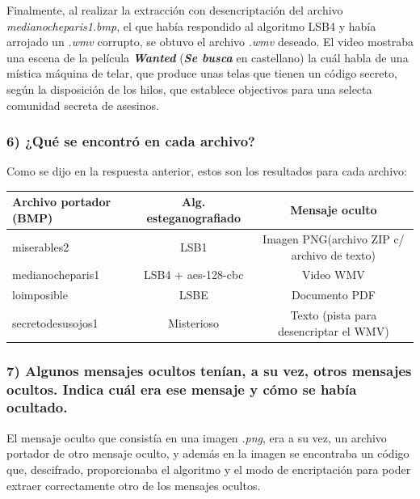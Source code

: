\documentclass[a4paper,10pt]{article}
\begin{document}
Finalmente, al realizar la extracción con desencriptación del archivo \textit{medianocheparis1.bmp}, el que había respondido al algoritmo LSB4 y había arrojado un 
\textit{.wmv} corrupto, se obtuvo el archivo \textit{.wmv} deseado. El video mostraba una escena de la película \textit{\textbf{Wanted}} (\textit{\textbf{Se busca}} en castellano)
la cuál habla de una mística máquina de telar, que produce unas telas que tienen un código secreto, según la disposición de los hilos, que establece objectivos para una selecta
comunidad secreta de asesinos.

\subsubsection*{ 6) ¿Qué se encontró en cada archivo?}

Como se dijo en la respuesta anterior, estos son los resultados para cada archivo:

\begin{center}
\begin{tabular}{|l|c|c|}
    \hline
    Archivo portador (BMP)  & Alg. esteganografiado         & Mensaje oculto     \\
    \hline
    miserables2             & LSB1                          & Imagen PNG(archivo ZIP c/ archivo de texto)\\
    \hline
    medianocheparis1        & LSB4 + aes-128-cbc            & Video WMV \\
    \hline
    loimposible             & LSBE                          & Documento PDF\\
    \hline
    secretodesusojos1       & Misterioso                    & Texto (pista para desencriptar el WMV)\\
    \hline
\end{tabular}
\end{center}

\subsubsection*{ 7) Algunos mensajes ocultos tenían, a su vez, otros mensajes ocultos. Indica cuál era ese mensaje
y cómo se había ocultado.}

El mensaje oculto que consistía en una imagen \textit{.png}, era a su vez, un archivo portador de otro mensaje oculto, y además en la imagen se encontraba
un código que, descifrado, proporcionaba el algoritmo y el modo de encriptación para poder extraer correctamente otro de los mensajes ocultos. \\
\end{document}

